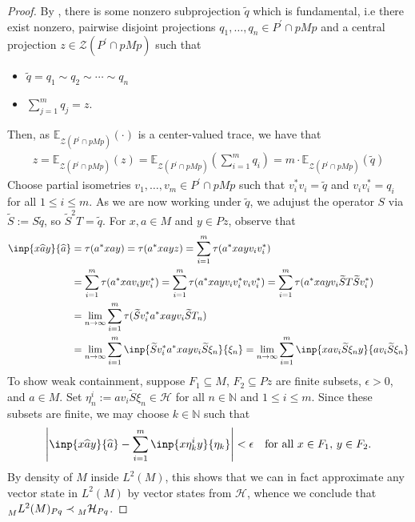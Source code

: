 \documentclass[a4paper,11pt]{article}
\numberwithin{equation}{section}
\theoremstyle{definition}
\theoremstyle{remark}
\numberwithin{equation}{section}
\def\N{\mathbb{N}}
\newcommand{\E}{\mathbb{E}}
\def\H{\mathcal H}
\def\sub{\subseteq}
\newcommand{\eps}{\epsilon}
\newcommand{\lr}[1]{\left(#1\right)}
\numberwithin{equation}{section}
\begin{document}
\begin{proof}
    By \cite[Part III, Chapter 8.2]{dix:81}, there is some nonzero subprojection $ \widetilde{q} $ which is fundamental, i.e there exist nonzero, pairwise disjoint projections $ q_{1}, \ldots, q_{n}\in P^{\prime}\cap pMp $ and a central projection $ z\in \mathcal{Z}(P^{\prime}\cap pMp) $ such that
    \begin{itemize}
        \item $ \widetilde{q}=q_{1}\sim q_{2}\sim \cdots\sim q_{n} $
        \item $ \sum_{j=1}^{m} q_{j} = z $.
    \end{itemize}
    Then, as $ \E_{\mathcal{Z}(P^{\prime}\cap pMp)}(\cdot) $ is a center-valued trace, we have that
    \begin{align*}
        z = \E_{\mathcal{Z}(P^{\prime}\cap pMp)}(z)= \E_{\mathcal{Z}(P^{\prime}\cap pMp)}\lr{\sum_{i=1}^{m} q_{i} } = m\cdot\E_{\mathcal{Z}(P^{\prime}\cap pMp)}(\widetilde{q}) 
    \end{align*}
    Choose partial isometries $ v_{1},\ldots, v_{m}\in P^{\prime}\cap pMp $ such that $ v_{i}^{*}v_{i}=\widetilde{q} $ and $ v_{i}v_{i}^{*} = q_{i} $ for all $ 1\leq i \leq m $. As we are now working under $ \widetilde{q} $, we adujust the operator $ S $ via $ \widetilde{S}:= S \widetilde{q} $, so $ \widetilde{S}^{2}T = \widetilde{q} $.
    For $ x,a \in M $ and $ y\in Pz $, observe that
    \begin{align*}
        \inp{x \widehat{a} y}{\widehat{a}} &= \tau(a^{*}xay) = \tau(a^{*}xayz) =\sum_{i=1}^{m} \tau(a^{*}xayv_{i}v_{i}^{*})\\
        &=\sum_{i=1}^{m} \tau(a^{*}xav_{i}yv_{i}^{*})=\sum_{i=1}^{m} \tau(a^{*}xayv_{i}v_{i}^{*}v_{i}v_{i}^{*})=\sum_{i=1}^{m} \tau(a^{*}xayv_{i}\widetilde{S}T \widetilde{S}v_{i}^{*})\\
        &= \lim_{n\to\infty} \sum_{i=1}^{m}\tau(\widetilde{S}v_{i}^{*}a^{*}xayv_{i} \widetilde{S}T_{n})\\
        &=\lim_{n\to\infty}\sum_{i=1}^{m} \inp{\widetilde{S}v_{i}^{*}a^{*}xay v_{i}\widetilde{S} \xi_{n}}{\xi_{n}} =\lim_{n\to\infty}\sum_{i=1}^{m} \inp{xa v_{i}\widetilde{S} \xi_{n} y}{av_{i}\widetilde{S}\xi_{n}}  \\
    \end{align*}
    To show weak containment, suppose $ F_{1}\sub M $, $ F_{2}\sub Pz $ are finite subsets, $ \eps>0 $, and $ a\in M $. Set $ \eta_{n}^{i}:= av_{i}\widetilde{S} \xi_{n}\in \H $ for all $ n\in \N $ and $ 1\leq i \leq m $. Since these subsets are finite, we may choose $ k\in \N $ such that $  $
    \[
        \left| \inp{x \widehat{a} y}{\widehat{a}} - \sum_{i=1}^{m}\inp{x \eta_{k}^{i}y}{\eta_{k}}\right| < \eps\quad \text{for all }x\in F_{1},\,y\in F_{2}.
    \]
    By density of $ M $ inside $ L^{2}(M) $, this shows that we can in fact approximate any vector state in $ L^{2}(M) $ by vector states from $ \H $, whence we conclude that $\prescript{}{M}{L^{2}(M)}_{Pq}\prec\prescript{}{M}{\H}_{Pq}$.
\end{proof}
\end{document}
